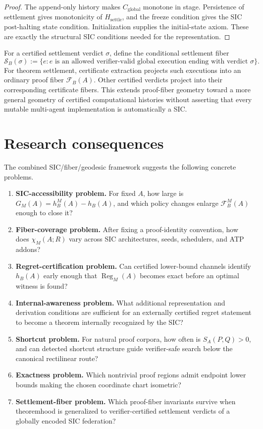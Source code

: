 \documentclass[11pt]{article}
\theoremstyle{definition}
\newcommand{\Fib}{\mathcal F}
\newcommand{\Reg}{\operatorname{Reg}}
\begin{document}
\begin{proof}
The append-only history makes $C_{\mathrm{global}}$ monotone in stage.  Persistence of settlement gives monotonicity of $H_{\mathrm{settle}}$, and the freeze condition gives the SIC post-halting state condition.  Initialization supplies the initial-state axiom.  These are exactly the structural SIC conditions needed for the representation.
\end{proof}

For a certified settlement verdict $\sigma$, define the conditional settlement fiber
\[
\mathcal S_B(\sigma):=
\{e:e\text{ is an allowed verifier-valid global execution ending with verdict }\sigma\}.
\]
For theorem settlement, certificate extraction projects such executions into an ordinary proof fiber $\Fib_B(A)$.  Other certified verdicts project into their corresponding certificate fibers.  This extends proof-fiber geometry toward a more general geometry of certified computational histories without asserting that every mutable multi-agent implementation is automatically a SIC.

\section{Research consequences}

The combined SIC/fiber/geodesic framework suggests the following concrete problems.
\begin{enumerate}[leftmargin=2em]
\item \textbf{SIC-accessibility problem.} For fixed $A$, how large is $G_M(A)=h_B^M(A)-h_B(A)$, and which policy changes enlarge $\Fib_B^M(A)$ enough to close it?
\item \textbf{Fiber-coverage problem.} After fixing a proof-identity convention, how does $\chi_M(A;R)$ vary across SIC architectures, seeds, schedulers, and ATP addons?
\item \textbf{Regret-certification problem.} Can certified lower-bound channels identify $h_B(A)$ early enough that $\Reg_M(A)$ becomes exact before an optimal witness is found?
\item \textbf{Internal-awareness problem.} What additional representation and derivation conditions are sufficient for an externally certified regret statement to become a theorem internally recognized by the SIC?
\item \textbf{Shortcut problem.} For natural proof corpora, how often is $S_A(P,Q)>0$, and can detected shortcut structure guide verifier-safe search below the canonical rectilinear route?
\item \textbf{Exactness problem.} Which nontrivial proof regions admit endpoint lower bounds making the chosen coordinate chart isometric?
\item \textbf{Settlement-fiber problem.} Which proof-fiber invariants survive when theoremhood is generalized to verifier-certified settlement verdicts of a globally encoded SIC federation?
\end{enumerate}
\end{document}
